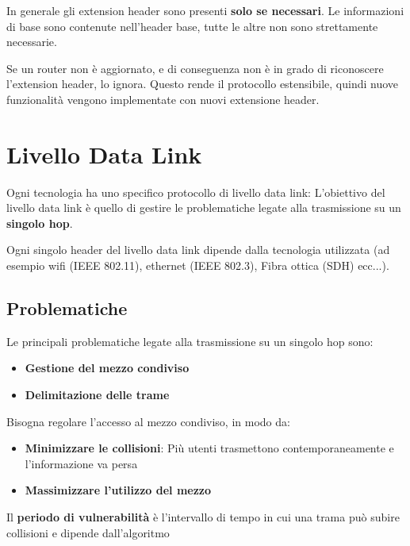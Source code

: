\documentclass[a4paper]{article}
\begin{document}
\noindent
In generale gli extension header sono presenti \textbf{solo se necessari}. Le informazioni
di base sono contenute nell'header base, tutte le altre non sono strettamente necessarie.

Se un router non è aggiornato, e di conseguenza non è in grado di riconoscere l'extension
header, lo ignora. Questo rende il protocollo estensibile, quindi nuove funzionalità
vengono implementate con nuovi extensione header.

\section{Livello Data Link}
Ogni tecnologia ha uno specifico protocollo di livello data link:
\label{03-12-D1}
L'obiettivo del livello data link è quello di gestire le problematiche legate alla
trasmissione su un \textbf{singolo hop}.

Ogni singolo header del livello data link dipende dalla tecnologia utilizzata (ad esempio
wifi (IEEE 802.11), ethernet (IEEE 802.3), Fibra ottica (SDH) ecc...).

\subsection{Problematiche}
Le principali problematiche legate alla trasmissione su un singolo hop sono:
\begin{itemize}
  \item \textbf{Gestione del mezzo condiviso}
  \item \textbf{Delimitazione delle trame}
\end{itemize}
Bisogna regolare l'accesso al mezzo condiviso, in modo da:
\begin{itemize}
  \item \textbf{Minimizzare le collisioni}: Più utenti trasmettono contemporaneamente e 
    l'informazione va persa
  \item \textbf{Massimizzare l'utilizzo del mezzo}
\end{itemize}

\vspace{1em}
\noindent
Il \textbf{periodo di vulnerabilità} è l'intervallo di tempo in cui una trama può subire
collisioni e dipende dall'algoritmo
\end{document}
